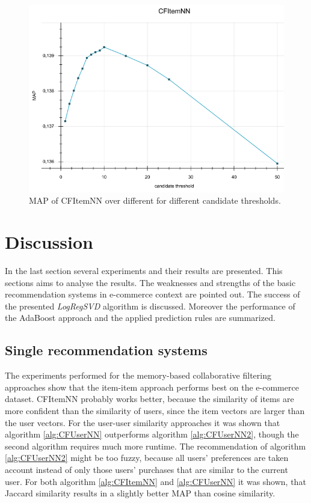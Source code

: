 \documentclass[10pt]{reportMaster}
\begin{document}
\begin{figure}
	\label{fig:CFItemNNCandidates}
	\caption{MAP of CFItemNN over different for different candidate thresholds. }
	\centering
	\includegraphics[width=1\textwidth]{figures/experiments/CFItemNNCandidates}
\end{figure}


\section{Discussion}
\label{sec:discussion}
In the last section several experiments and their results are presented.
This sections aims to analyse the results.
The weaknesses and strengths of the basic recommendation systems in e-commerce context are pointed out.
The success of the presented \textit{LogRegSVD} algorithm is discussed.
Moreover the performance of the AdaBoost approach and the applied prediction rules are summarized.

\subsection{Single recommendation systems}
\label{sec:discSingleRecommendationSystems}
The experiments performed for the memory-based collaborative filtering approaches show that the item-item approach performs best on the e-commerce dataset.
CFItemNN probably works better, because the similarity of items are more confident than the similarity of users, since the item vectors are larger than the user vectors.
For the user-user similarity approaches it was shown that algorithm \ref{alg:CFUserNN} outperforms algorithm \ref{alg:CFUserNN2}, though the second algorithm requires much more runtime.
The recommendation of algorithm \ref{alg:CFUserNN2} might be too fuzzy, because all users' preferences are taken account instead of only those users' purchases that are similar to the current user.
For both algorithm \ref{alg:CFItemNN} and \ref{alg:CFUserNN} it was shown, that Jaccard similarity results in a slightly better MAP than cosine similarity.
\end{document}
